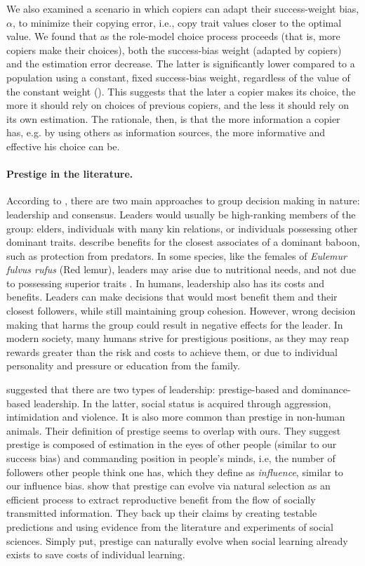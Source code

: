 \documentclass[12pt]{extarticle}
\begin{document}
We also examined a scenario in which copiers can adapt their success-weight bias, $\alpha$, to minimize their copying error, i.e., copy trait values closer to the optimal value.
We found that as the role-model choice process proceeds (that is, more copiers make their choices), both the success-bias weight (adapted by copiers) and the estimation error decrease. 
The latter is significantly lower compared to a population using a constant, fixed success-bias weight, regardless of the value of the constant weight ().
This suggests that the later a copier makes its choice, the more it should rely on choices of previous copiers, and the less it should rely on its own estimation.
The rationale, then, is that the more information a copier has, e.g. by using others as information sources, the more informative and effective his choice can be.

\paragraph{Prestige in the literature.}

According to \citet{animal_leadership}, there are two main approaches to group decision making in nature: leadership and consensus.
Leaders would usually be high-ranking members of the group: elders, individuals with many kin relations, or individuals possessing other dominant traits.
\citet{animal_leadership} describe benefits for the closest associates of a dominant baboon, such as protection from predators. 
In some species, like the females of \textit{Eulemur fulvus rufus} (Red lemur), leaders may arise due to nutritional needs, and not due to possessing superior traits \citep{lemurs}. 
In humans, leadership also has its costs and benefits. Leaders can make decisions that would most benefit them and their closest followers, while still maintaining group cohesion. 
However, wrong decision making that harms the group could result in negative effects for the leader. 
In modern society, many humans strive for prestigious positions, as they may reap rewards greater than the risk and costs to achieve them, or due to individual personality and pressure or education from the family. 

\citet{prestige_evolution} suggested that there are two types of leadership: prestige-based and dominance-based leadership.
In the latter, social status is acquired through aggression, intimidation and violence. It is also more common than prestige in non-human animals.
Their definition of prestige seems to overlap with ours. They suggest prestige is composed of estimation in the eyes of other people (similar to our success bias) and commanding position in people's minds, i.e, the number of followers other people think one has, which they define as \textit{influence}, similar to our influence bias.
\citet{prestige_evolution} show that prestige can evolve via natural selection as an efficient process to extract reproductive benefit from the flow of socially transmitted information. They back up their claims by creating testable predictions and using evidence from the literature and experiments of social sciences.
Simply put, prestige can naturally evolve when social learning already exists to save costs of individual learning. 
\end{document}
